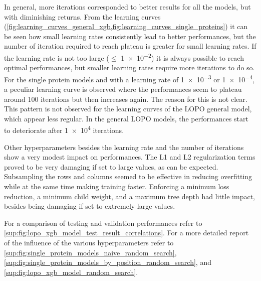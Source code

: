 In general, more iterations corresponded to better results for all the models, but with diminishing returns.
From the learning curves (\cref{fig:learning_curves_general_xgb,fig:learning_curves_single_proteins}) it can be seen how small learning rates consistently lead to better performances, but the number of iteration required to reach plateau is greater for small learning rates.
If the learning rate is not too large ($\leq$ \num{1e-2}) it is always possible to reach optimal performances, but smaller learning rates require more iterations to do so.
For the single protein models and with a learning rate of \num{1e-3} or \num{1e-4}, a peculiar learning curve is observed where the performances seem to plateau around \num{100} iterations but then increases again.
The reason for this is not clear.
This pattern is not observed for the learning curves of the LOPO general model, which appear less regular.
In the general LOPO models, the performances start to deteriorate after \num{1e4} iterations.

Other hyperparameters besides the learning rate and the number of iterations show a very modest impact on performances.
The L1 and L2 regularization terms proved to be very damaging if set to large values, as can be expected.
Subsampling the rows and columns seemed to be effective in reducing overfitting while at the same time making training faster.
Enforcing a minimum loss reduction, a minimum child weight, and a maximum tree depth had little impact, besides being damaging if set to extremely large values.

For a comparison of testing and validation performances refer to \autoref{sup:fig:lopo_xgb_model_test_result_correlations}.
For a more detailed report of the influence of the various hyperparameters refer to \autoref{sup:fig:single_protein_models_naive_random_search}, \autoref{sup:fig:single_protein_models_by_position_random_search}, and \autoref{sup:fig:lopo_xgb_model_random_search}.

\begin{figure}[t]
\end{figure}

